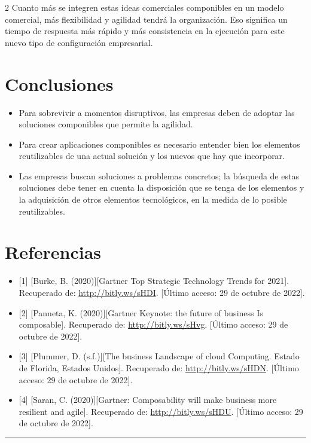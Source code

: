\documentclass[12pt,spanish,Letterpaper,openany]{book}
\newcommand{\HRule}{\begin{center}\rule{0.5\linewidth}{0.2mm}\end{center}}
\begin{document}
\begin {multicols}{2}
Cuanto más se integren estas ideas comerciales componibles en un modelo comercial, más flexibilidad y agilidad tendrá la organización. Eso significa un tiempo de respuesta más rápido y más consistencia en la ejecución para este nuevo tipo de configuración empresarial.

\hypertarget{conclusiones}{%
\section{Conclusiones}\label{conclusiones}}

\begin{itemize}
\item
  Para sobrevivir a momentos disruptivos, las empresas deben de adoptar las soluciones componibles que permite la agilidad.
\item
  Para crear aplicaciones componibles es necesario entender bien los elementos reutilizables de una actual solución y los nuevos que hay que incorporar.
\item
  Las empresas buscan soluciones a problemas concretos; la búsqueda de estas soluciones debe tener en cuenta la disposición que se tenga de los elementos y la adquisición de otros elementos tecnológicos, en la medida de lo posible reutilizables.
\end{itemize}

\hypertarget{referencias}{%
\section{Referencias}\label{referencias}}

\begin{itemize}
\item
  {[}1{]} {[}Burke, B. (2020){]}{[}Gartner Top Strategic Technology Trends for 2021{]}. Recuperado de: \url{http://bitly.ws/sHDI}. {[}Último acceso: 29 de octubre de 2022{]}.
\item
  {[}2{]} {[}Panneta, K. (2020){]}{[}Gartner Keynote: the future of business Is composable{]}. Recuperado de: \url{http://bitly.ws/sHvg}. {[}Último acceso: 29 de octubre de 2022{]}.
\item
  {[}3{]} {[}Plummer, D. (s.f.){]}{[}The business Landscape of cloud Computing. Estado de Florida, Estados Unidos{]}. Recuperado de: \url{http://bitly.ws/sHDN}. {[}Último acceso: 29 de octubre de 2022{]}.
\item
  {[}4{]} {[}Saran, C. (2020){]}{[}Gartner: Composability will make business more resilient and agile{]}. Recuperado de: \url{http://bitly.ws/sHDU}. {[}Último acceso: 29 de octubre de 2022{]}.
\end{itemize}

\end {multicols}
\medskip
\HRule
\medskip
\end{document}
